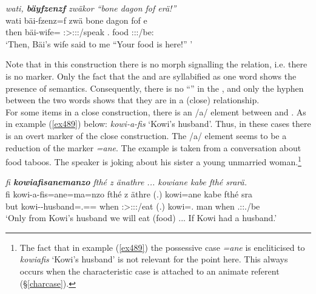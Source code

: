 \begin{exe}
	\ex \textit{wati, \textbf{bäyfzenzf} zwäkor ``bone dagon fof erä!''}\\
	\gll wati bäi-fzenz=f zwä bone dagon fof e\\
	then bäi-wife=\Erg{} \Stsg:\Sbj>\Fsg{}:\Obj:\Rpst:\Pfv/speak \Ssg{}.\Poss{} food \Emph{} \Stpl:\Sbj:\Nonpast:\Ipfv/be:\\ 
	\trans `Then, Bäi's wife said to me ``Your food is here!'' '
	\label{ex450}
\end{exe}

Note that in this construction there is no morph signalling the  relation, i.e. there is no   marker. Only the fact that the  and  are syllabified as one word shows the presence of  semantics. Consequently, there is no ``'' in the , and only the hyphen between the two words shows that they are in a (close)  relationship.\\

For some items in a close  construction, there is an /a/ element between  and . As in example (\ref{ex489}) below: \emph{kowi-a-fis} `Kowi's husband'. Thus, in these cases there is an overt marker of the close  construction. The /a/ element seems to be a reduction of the   marker \emph{=ane}. The example is taken from a conversation about food taboos. The speaker is joking about his sister \textendash{} a young unmarried woman.\footnote{The fact that in example (\ref{ex489}) the possessive case \emph{=ane} is encliticised to \emph{kowiafis} `Kowi's husband' is not relevant for the point here. This always occurs when the characteristic case is attached to an animate referent (\S{}\ref{charcase}).}

\begin{exe}
	\ex \emph{fi \textbf{kowiafisanemanzo} fthé z änathre ... kowiane kabe fthé srarä.}\\
	\gll fi kowi-a-fis=ane=ma=nzo fthé z äthre (.) kowi=ane kabe fthé sra\\
	but kowi-\Poss-husband=\Poss.\Sg=\Char=\Only{} when \Iam{} \Fpl:\Sbj>\Stpl:\Obj:\Nonpast:\Ipfv/eat (.) kowi=\Poss.\Sg{} man when \Tsg.\Masc:\Io:\Irr.\Ipfv/be\\
	\trans `Only from Kowi's husband we will eat (food) ... If Kowi had a husband.'\\
	\label{ex489}
\end{exe}

